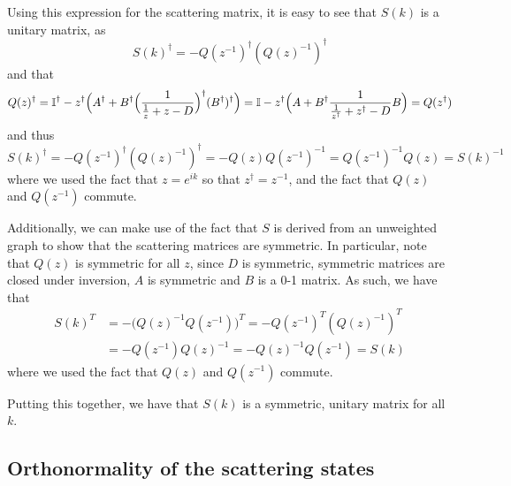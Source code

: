\documentclass[../thesis-main/thesis-main]{subfiles}
\begin{document}
Using this expression for the scattering matrix, it is easy to see that $S(k)$ is a unitary matrix, as 
\begin{equation}
  S(k)^{\dag} = - Q(z^{-1})^\dag (Q(z)^{-1})^\dag
\end{equation}
and that
\begin{equation}
  Q(z)^\dag = \mathbb{I}^\dag - z^\dag\Big( A^\dag + B^\dag \Big(\frac{1}{\frac{1}{z} + z - D}\Big)^\dag (B^\dag)^\dag\Big) 
     = \mathbb{I} - z^\dag \Big(A + B^\dag \frac{1}{\frac{1}{z^\dag} + z^\dag - D} B \Big) = Q(z^\dag)
\end{equation}
and thus
\begin{equation}
  S(k)^\dag = -Q(z^{-1})^\dag (Q(z)^{-1})^\dag = - Q(z) Q(z^{-1})^{-1} = Q(z^{-1})^{-1} Q(z) = S(k)^{-1}
\end{equation}
where we used the fact that $z=e^{ik}$ so that $z^\dag = z^{-1}$, and the fact that $Q(z)$ and $Q(z^{-1})$ commute.

Additionally, we can make use of the fact that $S$ is derived from an unweighted graph to show that the scattering matrices are symmetric.  In particular, note that $Q(z)$ is symmetric for all $z$, since $D$ is symmetric, symmetric matrices are closed under inversion, $A$ is symmetric and $B$ is a 0-1 matrix.  As such, we have that
\begin{align}
  S(k)^T &= -\big( Q(z)^{-1} Q(z^{-1})\big)^T = -Q(z^{-1})^T (Q(z)^{-1})^T \\
    &= -Q(z^{-1}) Q(z)^{-1} = -Q(z)^{-1} Q(z^{-1}) = S(k)
\end{align}
where we used the fact that $Q(z)$ and $Q(z^{-1})$ commute.

Putting this together, we have that $S(k)$ is a symmetric, unitary matrix for all $k$.


\subsection{Orthonormality of the scattering states}
\end{document}
